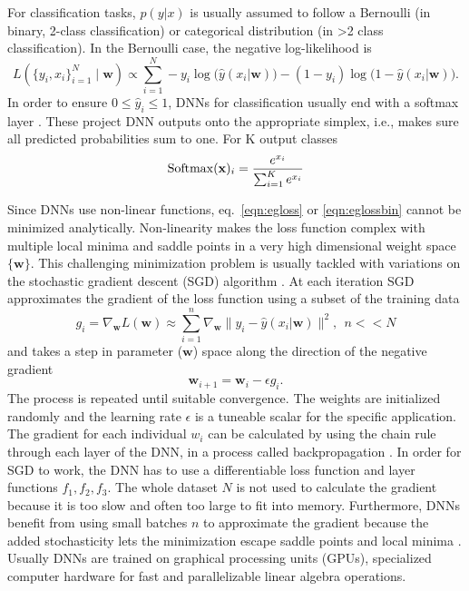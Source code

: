For classification tasks, $p(y|x)$ is usually assumed to follow a Bernoulli (in binary, 2-class classification) or categorical distribution (in >2 class classification). In the Bernoulli case, the negative log-likelihood is
\begin{equation}
    L(\{y_i,x_i\}_{i=1}^N\mid\mathbf{w}) \propto \sum^N_{i=1} - y_i\log\big(\hat{y}(x_i|\mathbf{w})\big) - (1 - y_i)\log\big(1 - \hat{y}(x_i|\mathbf{w}) \big).    
    \label{eqn:eglossbin}
\end{equation}
In order to ensure $0 \leq \hat{y}_i \leq 1$, DNNs for classification usually end with a softmax layer \citep{bridle_training_1990}. These project DNN outputs onto the appropriate simplex, i.e., makes sure all predicted probabilities sum to one. For K output classes
\begin{equation}
    \label{eqn:softmax}
    {\rm Softmax}(\mathbf{x})_i = \frac{e^{x_i}}{\sum_{i=1}^K e^{x_i}}
\end{equation}

Since DNNs use non-linear functions, eq.~\ref{eqn:egloss} or \ref{eqn:eglossbin} cannot be minimized analytically. Non-linearity makes the loss function complex with multiple local minima and saddle points in a very high dimensional weight space $\{\mathbf{w}\}$. %
This challenging minimization problem is usually tackled with variations on the stochastic gradient descent (SGD) algorithm \citep{goodfellow_deep_2016}. At each iteration SGD approximates the gradient of the loss function using a subset of the training data
\begin{equation}
    g_i = \nabla_{\mathbf{w}} L(\mathbf{w}) \approx \sum_{i=1}^n \nabla_{\mathbf{w}}\|y_i - \hat{y}(x_i|\mathbf{w})\|^2, ~~n << N
\end{equation}
and takes a step in parameter ($\mathbf{w}$) space along the direction of the negative gradient
\begin{equation}
    \mathbf{w}_{i+1} = \mathbf{w}_{i} - \epsilon g_i.
\end{equation}
The process is repeated until suitable convergence. The weights are initialized randomly and the learning rate $\epsilon$ is a tuneable scalar for the specific application. The gradient for each individual $w_i$ can be calculated by using the chain rule through each layer of the DNN, in a process called backpropagation \citep{goodfellow_deep_2016}. In order for SGD to work, the DNN has to use a differentiable loss function and layer functions $f_1,f_2,f_3$. 
The whole dataset $N$ is not used to calculate the gradient because it is too slow and often too large to fit into memory. Furthermore, DNNs benefit from using small batches $n$ to approximate the gradient because the added stochasticity lets the minimization escape saddle points and local minima \citep{goodfellow_deep_2016}. Usually DNNs are trained on graphical processing units (GPUs), specialized computer hardware for fast and parallelizable linear algebra operations. 

